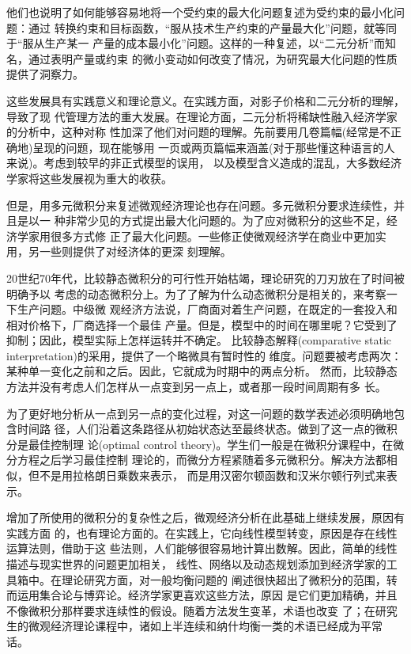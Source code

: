 他们也说明了如何能够容易地将一个受约束的最大化问题复述为受约束的最小化问题：通过
转换约束和目标函数，“服从技术生产约束的产量最大化”问题，就等同于“服从生产某一
产量的成本最小化”问题。这样的一种复述，以“二元分析”而知名，通过表明产量或约束
的微小变动如何改变了情况，为研究最大化问题的性质提供了洞察力。

这些发展具有实践意义和理论意义。在实践方面，对影子价格和二元分析的理解，导致了现
代管理方法的重大发展。在理论方面，二元分析将稀缺性融入经济学家的分析中，这种对称
性加深了他们对问题的理解。先前要用几卷篇幅(经常是不正确地)呈现的问题，现在能够用
一页或两页篇幅来涵盖(对于那些懂这种语言的人来说)。考虑到较早的非正式模型的误用，
以及模型含义造成的混乱，大多数经济学家将这些发展视为重大的收获。

但是，用多元微积分来复述微观经济理论也存在问题。多元微积分要求连续性，并且是以一
种非常少见的方式提出最大化问题的。为了应对微积分的这些不足，经济学家用很多方式修
正了最大化问题。一些修正使微观经济学在商业中更加实用，另一些则提供了对经济体的更深
刻理解。

20世纪70年代，比较静态微积分的可行性开始枯竭，理论研究的刀刃放在了时间被明确予以
考虑的动态微积分上。为了了解为什么动态微积分是相关的，来考察一下生产问题。中级微
观经济方法说，厂商面对着生产问题，在既定的一套投入和相对价格下，厂商选择一个最佳
产量。但是，模型中的时间在哪里呢？它受到了抑制；因此，模型实际上怎样运转并不确定。
比较静态解释(comparative static interpretation)的采用，提供了一个略微具有暂时性的
维度。问题要被考虑两次：某种单一变化之前和之后。因此，它就成为时期中的两点分析。
然而，比较静态方法并没有考虑人们怎样从一点变到另一点上，或者那一段时间周期有多
长。

为了更好地分析从一点到另一点的变化过程，对这一问题的数学表述必须明确地包含时间路
径，人们沿着这条路径从初始状态达至最终状态。做到了这一点的微积分是最佳控制理
论(optimal control theory)。学生们一般是在微积分课程中，在微分方程之后学习最佳控制
理论的，而微分方程紧随着多元微积分。解决方法都相似，但不是用拉格朗日乘数来表示，
而是用汉密尔顿函数和汉米尔顿行列式来表示。

增加了所使用的微积分的复杂性之后，微观经济分析在此基础上继续发展，原因有实践方面
的，也有理论方面的。在实践上，它向线性模型转变，原因是存在线性运算法则，借助于这
些法则，人们能够很容易地计算出数解。因此，简单的线性描述与现实世界的问题更加相关，
线性、网络以及动态规划添加到经济学家的工具箱中。在理论研究方面，对一般均衡问题的
阐述很快超出了微积分的范围，转而运用集合论与博弈论。经济学家更喜欢这些方法，原因
是它们更加精确，并且不像微积分那样要求连续性的假设。随着方法发生变革，术语也改变
了；在研究生的微观经济理论课程中，诸如上半连续和纳什均衡一类的术语已经成为平常
话。

